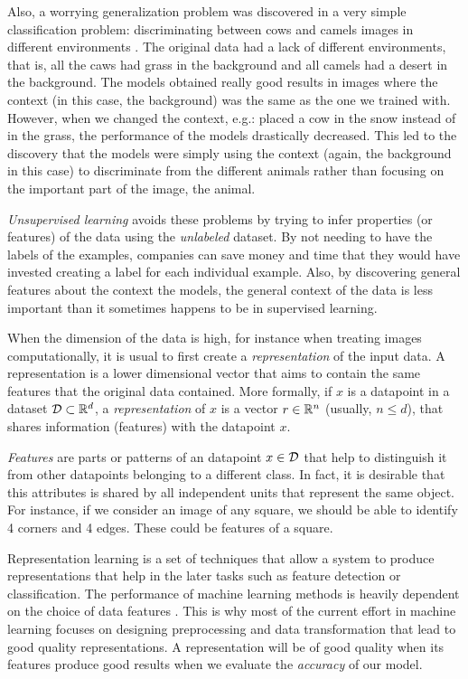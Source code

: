 Also, a worrying generalization problem was discovered in a very simple classification problem: discriminating between cows and camels images in different environments \citep{beery2018recognition}. The original data had a lack of different environments, that is, all the caws had grass in the background and all camels had a desert in the background. The models obtained really good results in images where the context (in this case, the background) was the same as the one we trained with. However, when we changed the context, e.g.: placed a cow in the snow instead of in the grass, the performance of the models drastically decreased. This led to the discovery that the models were simply using the context (again, the background in this case) to discriminate from the different animals rather than focusing on the important part of the image, the animal.

\emph{Unsupervised learning} avoids these problems by trying to infer properties (or features) of the data using the \emph{unlabeled} dataset. By not needing to have the labels of the examples, companies can save money and time that they would have invested creating a label for each individual example. Also, by discovering general features about the context the models, the general context of the data is less important than it sometimes happens to be in supervised learning.

When the dimension of the data is high, for instance when treating images computationally, it is usual to first create a \emph{representation} of the input data. A representation is a lower dimensional vector that aims to contain the same features that the original data contained. More formally, if $x$ is a datapoint in a dataset $\mathcal{D} \subset \mathbb{R}^d$, a \emph{representation} of $x$ is a vector $r \in \mathbb{R}^n$ (usually, $n \leq d$), that shares information (features) with the datapoint $x$. 


\emph{Features} are parts or patterns of an datapoint $x \in \mathcal{D}$ that help to distinguish it from other datapoints belonging to a different class. In fact, it is desirable that this attributes is shared by all independent units that represent the same object. For instance, if we consider an image of any square, we should be able to identify 4 corners and 4 edges. These could be features of a square.

Representation learning is a set of techniques that allow a system to produce representations that help in the later tasks such as feature detection or classification.
The performance of machine learning methods is heavily dependent on the choice of data features \citep{bengio_representation_2014}. This is why most of the current 
effort in machine learning focuses on designing preprocessing and data transformation that lead to good quality representations. A representation will be of good quality when its features
produce good results when we evaluate the \emph{accuracy} of our model.

